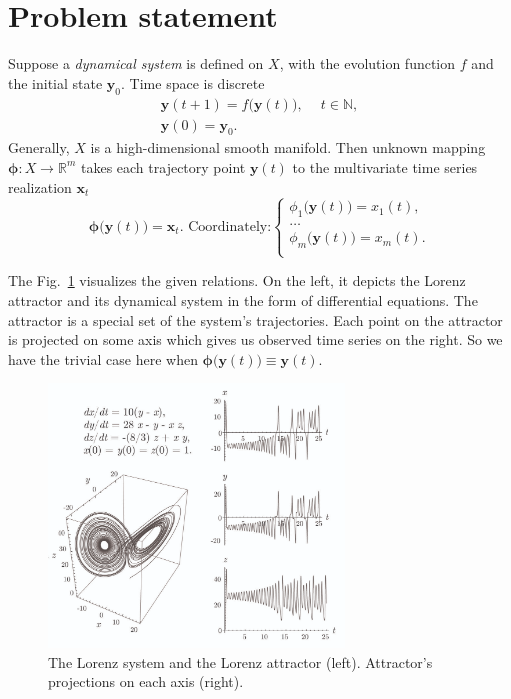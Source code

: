 \documentclass[referee, pdflatex, sn-mathphys-num]{sn-jnl}
\theoremstyle{definition}
\theoremstyle{plain}
\begin{document}
	\section{Problem statement}\label{sec:problem_statement}
	
	Suppose a \emph{dynamical system} is defined on $ X $, with the evolution function $ f $ and the initial state $ \mathbf{y}_0 $. Time space is discrete \begin{gather*}
		\mathbf{y}(t + 1) = f \bigl( \mathbf{y}(t) \bigr), \quad \ t \in \mathbb{N}, \\
		\mathbf{y}(0) = \mathbf{y}_0 .
	\end{gather*} Generally, $ X $ is a high-dimensional smooth manifold. Then unknown mapping $ \boldsymbol{\phi}: X \to \mathbb{R}^m $ takes each trajectory point $ \mathbf{y}(t) $ to the multivariate time series realization $ \mathbf{x}_t $ \begin{equation*}
		\boldsymbol{\phi} \bigl( \mathbf{y}(t) \bigr) = \mathbf{x}_t. \text{ Coordinately:} \begin{cases}
			\phi_1 \bigl( \mathbf{y}(t) \bigr) = x_1(t), \\
			\ldots \\
			\phi_m \bigl( \mathbf{y}(t) \bigr) = x_m(t). \\
		\end{cases}
	\end{equation*}
	
	The Fig.~{\ref{pic:attractor}} visualizes the given relations. On the left, it depicts the Lorenz attractor and its dynamical system in the form of differential equations. The attractor is a special set of the system's trajectories. Each point on the attractor is projected on some axis which gives us observed time series on the right. So we have the trivial case here when $\boldsymbol{\phi} \bigl( \mathbf{y}(t) \bigr) \equiv \mathbf{y}(t)$.
	
	\begin{figure}[!htbp]
		\centering
		\includegraphics[width=0.7\textwidth, keepaspectratio]{attractor_3d.png}
		\caption{The Lorenz system and the Lorenz attractor (left). Attractor's projections on each axis (right).}\label{pic:attractor}
	\end{figure}
	
\end{document}
